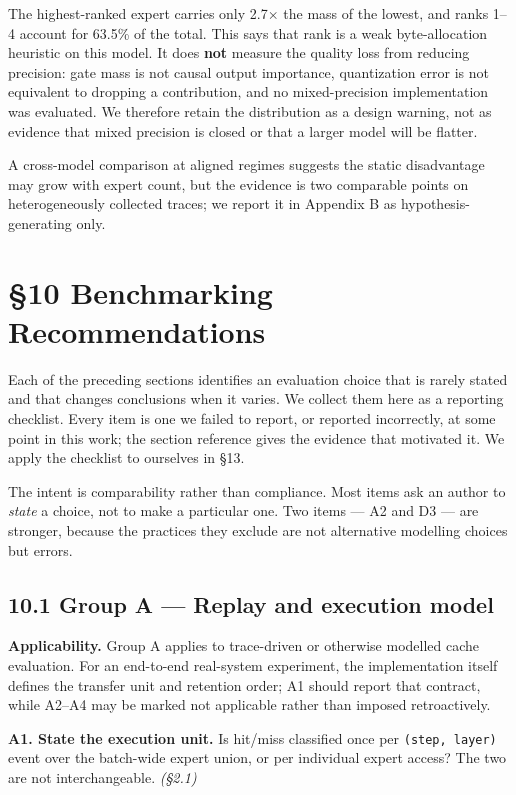 \documentclass[
  10pt,
  letterpaper,
  10pt]{article}
\begin{document}
The highest-ranked expert carries only 2.7\(\times\) the mass of the
lowest, and ranks 1--4 account for 63.5\% of the total. This says that
rank is a weak byte-allocation heuristic on this model. It does
\textbf{not} measure the quality loss from reducing precision: gate mass
is not causal output importance, quantization error is not equivalent to
dropping a contribution, and no mixed-precision implementation was
evaluated. We therefore retain the distribution as a design warning, not
as evidence that mixed precision is closed or that a larger model will
be flatter.

A cross-model comparison at aligned regimes suggests the static
disadvantage may grow with expert count, but the evidence is two
comparable points on heterogeneously collected traces; we report it in
Appendix B as hypothesis-generating only.

\section{§10 Benchmarking
Recommendations}\label{benchmarking-recommendations}

Each of the preceding sections identifies an evaluation choice that is
rarely stated and that changes conclusions when it varies. We collect
them here as a reporting checklist. Every item is one we failed to
report, or reported incorrectly, at some point in this work; the section
reference gives the evidence that motivated it. We apply the checklist
to ourselves in §13.

The intent is comparability rather than compliance. Most items ask an
author to \emph{state} a choice, not to make a particular one. Two items
--- A2 and D3 --- are stronger, because the practices they exclude are
not alternative modelling choices but errors.

\subsection{10.1 Group A --- Replay and execution
model}\label{group-a-replay-and-execution-model}

\textbf{Applicability.} Group A applies to trace-driven or otherwise
modelled cache evaluation. For an end-to-end real-system experiment, the
implementation itself defines the transfer unit and retention order; A1
should report that contract, while A2--A4 may be marked not applicable
rather than imposed retroactively.

\textbf{A1. State the execution unit.} Is hit/miss classified once per
\texttt{(step,\ layer)} event over the batch-wide expert union, or per
individual expert access? The two are not interchangeable. \emph{(§2.1)}
\end{document}
